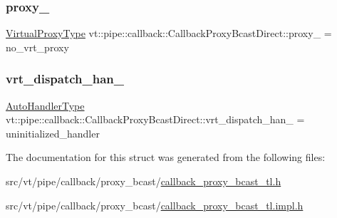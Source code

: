 \mbox{\label{structvt_1_1pipe_1_1callback_1_1_callback_proxy_bcast_direct_a7af23d7b32e39f4dbcfe35b5acb31f26}} 
\subsubsection{\texorpdfstring{proxy\+\_\+}{proxy\_}}
{\footnotesize\ttfamily \hyperlink{namespacevt_a1b417dd5d684f045bb58a0ede70045ac}{Virtual\+Proxy\+Type} vt\+::pipe\+::callback\+::\+Callback\+Proxy\+Bcast\+Direct\+::proxy\+\_\+ = no\+\_\+vrt\+\_\+proxy\hspace{0.3cm}{\ttfamily [private]}}

\mbox{\label{structvt_1_1pipe_1_1callback_1_1_callback_proxy_bcast_direct_abbf88c330fa96ba4da3dae7f207a1641}} 
\subsubsection{\texorpdfstring{vrt\+\_\+dispatch\+\_\+han\+\_\+}{vrt\_dispatch\_han\_}}
{\footnotesize\ttfamily \hyperlink{structvt_1_1pipe_1_1callback_1_1_callback_proxy_bcast_direct_a543cd86434430bd048952534f4fbc128}{Auto\+Handler\+Type} vt\+::pipe\+::callback\+::\+Callback\+Proxy\+Bcast\+Direct\+::vrt\+\_\+dispatch\+\_\+han\+\_\+ = uninitialized\+\_\+handler\hspace{0.3cm}{\ttfamily [private]}}



The documentation for this struct was generated from the following files\+:\begin{DoxyCompactItemize}
\item 
src/vt/pipe/callback/proxy\+\_\+bcast/\hyperlink{callback__proxy__bcast__tl_8h}{callback\+\_\+proxy\+\_\+bcast\+\_\+tl.\+h}\item 
src/vt/pipe/callback/proxy\+\_\+bcast/\hyperlink{callback__proxy__bcast__tl_8impl_8h}{callback\+\_\+proxy\+\_\+bcast\+\_\+tl.\+impl.\+h}\end{DoxyCompactItemize}
